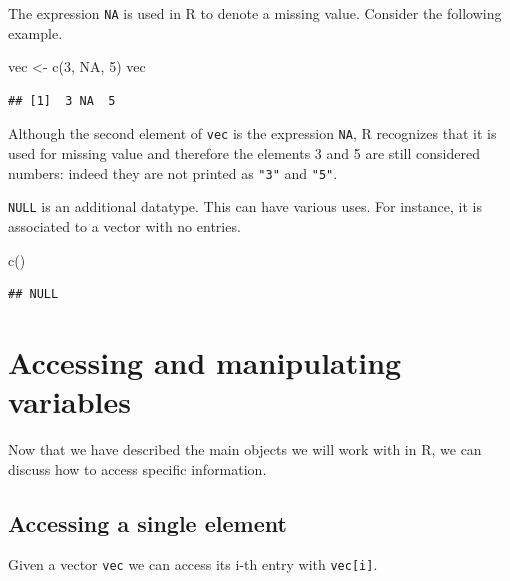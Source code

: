 \documentclass[
]{book}
\newenvironment{Shaded}{\begin{snugshade}}{\end{snugshade}}
\newcommand{\ConstantTok}[1]{\textcolor[rgb]{0.00,0.00,0.00}{#1}}
\newcommand{\DecValTok}[1]{\textcolor[rgb]{0.00,0.00,0.81}{#1}}
\newcommand{\FunctionTok}[1]{\textcolor[rgb]{0.00,0.00,0.00}{#1}}
\newcommand{\NormalTok}[1]{#1}
\newcommand{\OtherTok}[1]{\textcolor[rgb]{0.56,0.35,0.01}{#1}}
\begin{document}
The expression \texttt{NA} is used in R to denote a missing value. Consider the following example.

\begin{Shaded}
\begin{Highlighting}[]
\NormalTok{vec }\OtherTok{\textless{}{-}} \FunctionTok{c}\NormalTok{(}\DecValTok{3}\NormalTok{, }\ConstantTok{NA}\NormalTok{, }\DecValTok{5}\NormalTok{)}
\NormalTok{vec}
\end{Highlighting}
\end{Shaded}

\begin{verbatim}
## [1]  3 NA  5
\end{verbatim}

Although the second element of \texttt{vec} is the expression \texttt{NA}, R recognizes that it is used for missing value and therefore the elements 3 and 5 are still considered numbers: indeed they are not printed as \texttt{"3"} and \texttt{"5"}.

\texttt{NULL} is an additional datatype. This can have various uses. For instance, it is associated to a vector with no entries.

\begin{Shaded}
\begin{Highlighting}[]
\FunctionTok{c}\NormalTok{()}
\end{Highlighting}
\end{Shaded}

\begin{verbatim}
## NULL
\end{verbatim}

\hypertarget{accessing-and-manipulating-variables}{%
\section{Accessing and manipulating variables}\label{accessing-and-manipulating-variables}}

Now that we have described the main objects we will work with in R, we can discuss how to access specific information.

\hypertarget{accessing-a-single-element}{%
\subsection{Accessing a single element}\label{accessing-a-single-element}}

Given a vector \texttt{vec} we can access its i-th entry with \texttt{vec{[}i{]}}.
\end{document}
